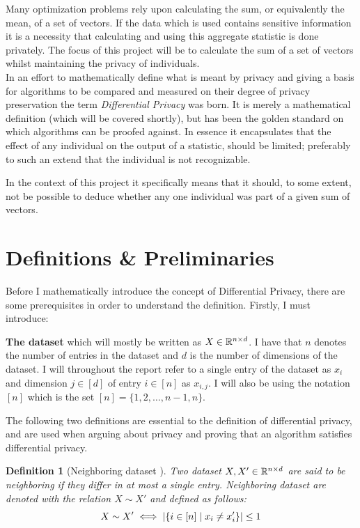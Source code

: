 \documentclass[a4paper,12pt]{article}
\newtheorem{definition}{Definition}[section]
\begin{document}
\noindent Many optimization problems rely upon calculating the sum, or equivalently the mean,
of a set of vectors.
If the data which is used contains sensitive information it is a necessity that
calculating and using this aggregate statistic is done privately.
The focus of this project will be to calculate the sum of a set of vectors whilst
maintaining the privacy of individuals. \\

In an effort to mathematically define what is meant by privacy and giving a basis for algorithms to be compared and measured on their degree of privacy preservation
the term \textit{Differential Privacy} was born. It is merely a mathematical definition (which will be covered shortly), but has been the golden standard on which
algorithms can be proofed against.
In essence it encapsulates that the effect of any individual on the output of a statistic,
should be limited; preferably to such an extend that the individual is not recognizable.

\noindent In the context of this project it specifically means that it should,
to some extent, not be possible to deduce whether any one individual was part of a given sum of vectors.

\section{Definitions \& Preliminaries}
Before I mathematically introduce the concept of Differential Privacy, there are some prerequisites in order to understand the definition.
Firstly, I must introduce:

\textbf{The dataset} which will mostly be written as $X \in \mathbb{R}^{n \times d}$.
I have that $n$ denotes the number of entries in the dataset and
$d$ is the number of dimensions of the dataset.
I will throughout the report refer to a single entry of
the dataset as $x_i$ and dimension $j \in [d]$ of entry $i \in [n]$ as $x_{i,j}$.
I will also be using the notation $[n]$ which is the set $[n] = \{1,2,\dots,n-1, n\}$.
\vspace*{0.3cm}

\noindent The following two definitions are essential to the definition of differential privacy, and are used
when arguing about privacy and proving that an algorithm satisfies differential privacy.
\begin{definition}[Neighboring dataset \cite{dpbasic}]
Two dataset $X, X' \in \mathbb{R}^{n \times d}$ are said to be
neighboring if they differ in at most a single entry.
Neighboring dataset are denoted with the relation $X \sim X'$ and defined as follows:
\[ X \sim X' \iff \left | \left \{ i \in [n] \; \text{\textbar} \;  x_i \ne x_i' \right\} \right| \le 1 \]
\end{definition}
\end{document}
